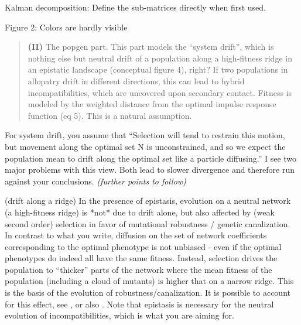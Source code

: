 \begin{point}{Kalman decomposition:}
    Define the sub-matrices directly when first used.
\end{point}


\begin{point}{Figure 2:}
    Colors are hardly visible
\end{point}


\begin{quote}
    \textbf{(II)} The popgen part. This part models the ``system drift'', which is nothing else
but neutral drift of a population along a high-fitness ridge in an epistatic
landscape (conceptual figure 4), right? If two populations in allopatry drift
in different directions, this can lead to hybrid incompatibilities, which are
uncovered upon secondary contact. Fitness is modeled by the weighted distance
from the optimal impulse response function (eq 5). This is a natural
assumption.
\end{quote}


\begin{point}{}
    For system drift, you assume that ``Selection will tend to restrain this
motion, but movement along the optimal set N is unconstrained, and so we expect
the population mean to drift along the optimal set like a particle diffusing.''
I see two major problems with this view. Both lead to slower divergence and
therefore run against your conclusions.
    \textit{(further points to follow)}
\end{point}


\begin{point}{(drift along a ridge)}
    In the presence of epistasis, evolution on a neutral network (a high-fitness
    ridge) is *not* due to drift alone, but also affected by (weak second order)
    selection in favor of mutational robustness / genetic canalization. In contrast
    to what you write, diffusion on the set of network coefficients corresponding
    to the optimal phenotype is not unbiased - even if the optimal phenotypes do
    indeed all have the same fitness. Instead, selection drives the population to
    ``thicker'' parts of the network where the mean fitness of the population
    (including a cloud of mutants) is higher that on a narrow ridge. This is the
    basis of the evolution of robustness/canalization. It is possible to account
    for this effect, see \citet{hermisson2003epistasis,alvarez2009effects}, 
    or also \citet{rice1998evolution,neutral_network_physics}.
    Note that epistasis is necessary for the neutral evolution of incompatibilities,
    which is what you are aiming for.
\end{point}


